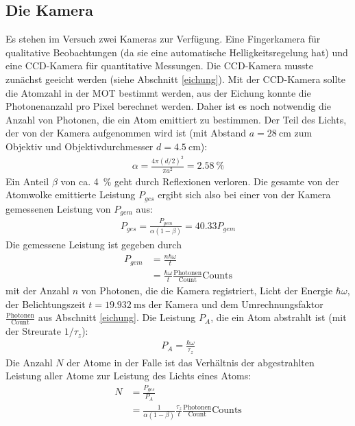 \documentclass[12pt, a4paper]{article}
\begin{document}
  \subsection{Die Kamera}
    Es stehen im Versuch zwei Kameras zur Verfügung. Eine Fingerkamera für qualitative
    Beobachtungen (da sie eine automatische Helligkeitsregelung hat) und eine
    CCD-Kamera für quantitative Messungen. Die CCD-Kamera musste zunächst geeicht
    werden (siehe Abschnitt \ref{eichung}). Mit der CCD-Kamera sollte die Atomzahl in
    der MOT bestimmt werden, aus der Eichung konnte die Photonenanzahl pro Pixel
    berechnet werden. Daher ist es noch notwendig die Anzahl von Photonen, die ein Atom
    emittiert zu bestimmen. Der Teil des Lichts, der von der Kamera aufgenommen wird
    ist (mit Abstand $a = \SI{28}{\cm}$ zum Objektiv und Objektivdurchmesser $d =
    \SI{4.5}{\cm}$):
    \begin{align*}
      \alpha = \frac{4 \pi (d / 2)^2}{\pi a^2} = \SI{2.58}{\percent}
    \end{align*}
    Ein Anteil $\beta$ von ca. \SI{4}{\percent} geht durch Reflexionen verloren. Die
    gesamte von der Atomwolke emittierte Leistung $P_{ges}$ ergibt sich also bei einer
    von der Kamera gemessenen Leistung von $P_{gem}$ aus:
    \begin{align*}
      P_{ges} = \frac{P_{gem}}{\alpha (1 - \beta)} = 40.33 P_{gem}
    \end{align*}
    Die gemessene Leistung ist gegeben durch
    \begin{align*}
      P_{gem} &= \frac{n \hbar \omega}{t} \\
      &= \frac{\hbar \omega}{t} \frac{\text{Photonen}}{\text{Count}} \text{Counts}
    \end{align*}
    mit der Anzahl $n$ von Photonen, die die Kamera registriert, Licht der Energie
    $\hbar \omega$, der Belichtungszeit $t = \SI{19.932}{\ms}$ der Kamera und dem
    Umrechnungsfaktor $\frac{\text{Photonen}}{\text{Count}}$ aus Abschnitt
    \ref{eichung}.
    Die Leistung $P_A$, die ein Atom abstrahlt ist (mit der Streurate $1 / \tau_z$):
    \begin{align*}
      P_A = \frac{\hbar \omega}{\tau_z}
    \end{align*}
    Die Anzahl $N$ der Atome in der Falle ist das Verhältnis der abgestrahlten Leistung
    aller Atome zur Leistung des Lichts eines Atoms:
    \begin{align*}
      N &= \frac{P_{ges}}{P_A} \\
      &= \frac{1}{\alpha (1 - \beta)} \frac{\tau_z}{t}
        \frac{\text{Photonen}}{\text{Count}} \text{Counts}
    \end{align*}
\end{document}
